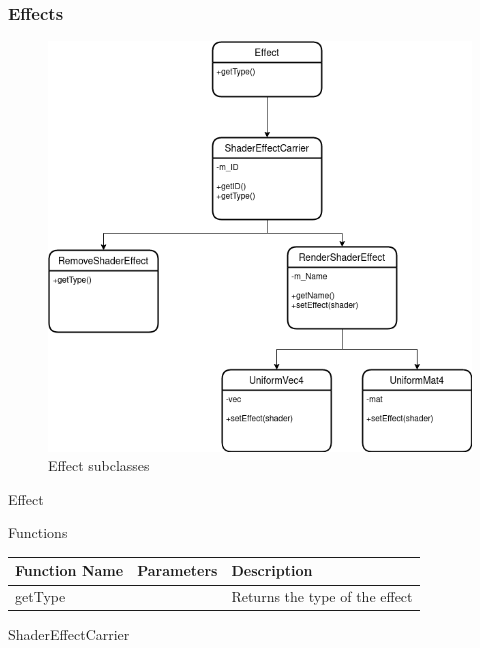 \documentclass{article}
\begin{document}
            \subsubsection{Effects}
                \begin{figure}[hbt!]
                    \centerline{\includegraphics[scale=0.5]{img/Classes/Effects.png}}
                    \caption{Effect subclasses}
                    \label{fig}
                \end{figure}
                Effect
                \begin{center}
                    Functions
                    \begin{tabular}{ | m{} | m{}| m{} | }
                        \hline
                        \textbf{Function Name} & \textbf{Parameters} & \textbf{Description} \\
                        \hline
                        getType & & Returns the type of the effect \\
                        \hline
                    \end{tabular}
                \end{center}
                ShaderEffectCarrier
\end{document}
